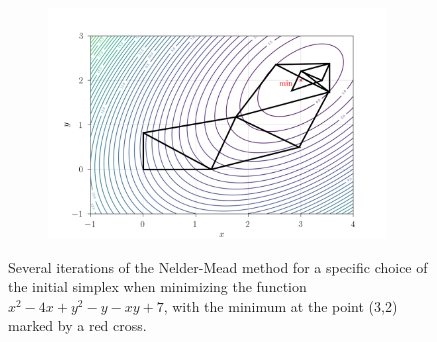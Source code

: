 \begin{figure}[H]
\begin{subfigure}[b]{0.32\textwidth}
	\end{subfigure}
	\begin{center}
		\begin{subfigure}[b]{0.66\textwidth}
			\centering
			\includegraphics[width=0.985\textwidth, trim={0 6mm 0 9mm}]{figures/nelder.png}
		\end{subfigure}
	\end{center}
	
	\caption{Several iterations of the Nelder-Mead method for a specific choice of the initial simplex when minimizing the function $ x^2 - 4x + y^2 - y - xy + 7 $, with the minimum at the point (3,2) marked by a red cross.}
	\label{fig:NM}
\end{figure}

